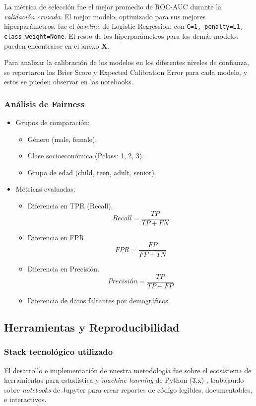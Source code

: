 \documentclass[conference]{IEEEtran}
\begin{document}
La métrica de selección fue el mejor promedio de ROC-AUC durante la \emph{validación cruzada}.
El mejor modelo, optimizado para sus mejores hiperparámetros, fue el \emph{baseline} de
Logistic Regression, con \texttt{C=1, penalty=L1, class\_weight=None}. El resto de los
hiperparámetros para los demás modelos pueden encontrarse en el anexo \textbf{X}.

Para analizar la calibración de los modelos en los diferentes niveles de confianza, se
reportaron los Brier Score y Expected Calibration Error para cada modelo, y estos se
pueden observar en las notebooks.
\subsubsection{Análisis de Fairness}
\label{sec:org1d0c628}
\begin{itemize}
\item Grupos de comparación:
\begin{itemize}
\item Género (male, female).
\item Clase socioeconómica (Pclass: 1, 2, 3).
\item Grupo de edad (child, teen, adult, senior).
\end{itemize}

\item Métricas evaluadas:  
\begin{itemize}
\item Diferencia en TPR (Recall).
$$Recall = \frac{TP}{TP+FN}$$
\item Diferencia en FPR.
$$FPR = \frac{FP}{FP+TN}$$
\item Diferencia en Precisión.
$$Precisión = \frac{TP}{TP+FP}$$
\item Diferencia de datos faltantes por demográficos.
\end{itemize}
\end{itemize}
\subsection{Herramientas y Reproducibilidad}
\label{sec:org68bff18}

\subsubsection{Stack tecnológico utilizado}
\label{sec:orgc4d2a39}
El desarrollo e implementación de nuestra metodología fue sobre el ecosistema de
herramientas para estadística y \emph{machine learning} de Python (3.x) \autocite{python2020},
trabajando sobre \emph{notebooks} de Jupyter \autocite{kluyver2016jupyter} para crear reportes de
código legibles, documentables, e interactivos.
\end{document}
